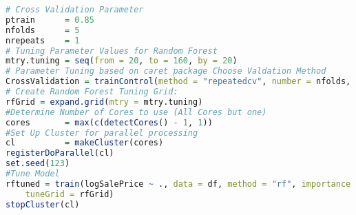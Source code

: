\begin{lstlisting}[language=R]
# Cross Validation Parameter
ptrain      = 0.85
nfolds      = 5
nrepeats    = 1
# Tuning Parameter Values for Random Forest
mtry.tuning = seq(from = 20, to = 160, by = 20)
# Parameter Tuning based on caret package Choose Valdation Method
CrossValidation = trainControl(method = "repeatedcv", number = nfolds, p = ptrain, repeats = nrepeats)
# Create Random Forest Tuning Grid:
rfGrid = expand.grid(mtry = mtry.tuning)
#Determine Number of Cores to use (All Cores but one)
cores       = max(c(detectCores() - 1, 1))
#Set Up Cluster for parallel processing
cl          = makeCluster(cores)
registerDoParallel(cl)
set.seed(123)
#Tune Model
rftuned = train(logSalePrice ~ ., data = df, method = "rf", importance = TRUE, trControl = CrossValidation, verbose = TRUE, 
    tuneGrid = rfGrid)
stopCluster(cl)
\end{lstlisting}